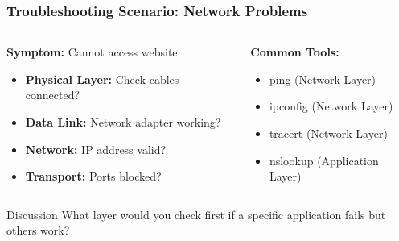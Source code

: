 \documentclass{beamer}
\begin{document}
\begin{frame}
    \frametitle{Troubleshooting Scenario: Network Problems}
    
    \begin{columns}[t]
        \begin{column}{0.5\textwidth}
            \textbf{Symptom:} Cannot access website
            \begin{itemize}
                \item \textbf{Physical Layer:} Check cables connected?
                \item \textbf{Data Link:} Network adapter working?
                \item \textbf{Network:} IP address valid?
                \item \textbf{Transport:} Ports blocked?
            \end{itemize}
        \end{column}
        
        \begin{column}{0.5\textwidth}
            \textbf{Common Tools:}
            \begin{itemize}
                \item ping (Network Layer)
                \item ipconfig (Network Layer)
                \item tracert (Network Layer)
                \item nslookup (Application Layer)
            \end{itemize}
        \end{column}
    \end{columns}
    
    \begin{block}{Discussion}
        What layer would you check first if a specific application fails but others work?
    \end{block}
\end{frame}
\end{document}
